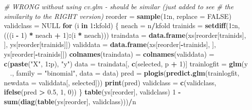 \documentclass[]{article}
\newenvironment{Shaded}{\begin{snugshade}}{\end{snugshade}}
\newcommand{\KeywordTok}[1]{\textcolor[rgb]{0.13,0.29,0.53}{\textbf{#1}}}
\newcommand{\DataTypeTok}[1]{\textcolor[rgb]{0.13,0.29,0.53}{#1}}
\newcommand{\DecValTok}[1]{\textcolor[rgb]{0.00,0.00,0.81}{#1}}
\newcommand{\FloatTok}[1]{\textcolor[rgb]{0.00,0.00,0.81}{#1}}
\newcommand{\StringTok}[1]{\textcolor[rgb]{0.31,0.60,0.02}{#1}}
\newcommand{\CommentTok}[1]{\textcolor[rgb]{0.56,0.35,0.01}{\textit{#1}}}
\newcommand{\OtherTok}[1]{\textcolor[rgb]{0.56,0.35,0.01}{#1}}
\newcommand{\ControlFlowTok}[1]{\textcolor[rgb]{0.13,0.29,0.53}{\textbf{#1}}}
\newcommand{\OperatorTok}[1]{\textcolor[rgb]{0.81,0.36,0.00}{\textbf{#1}}}
\newcommand{\NormalTok}[1]{#1}
\begin{document}
\begin{Shaded}
\begin{Highlighting}[]
{{\CommentTok{# WRONG without using cv.glm - should be similar (just added to see}
\CommentTok{# the similarity to the RIGHT version)}
\NormalTok{reorder =}\StringTok{ }\KeywordTok{sample}\NormalTok{(}\DecValTok{1}\OperatorTok{:}\NormalTok{n, }\DataTypeTok{replace =} \OtherTok{FALSE}\NormalTok{)}
\NormalTok{validclass =}\StringTok{ }\OtherTok{NULL}
\ControlFlowTok{for}\NormalTok{ (i }\ControlFlowTok{in} \DecValTok{1}\OperatorTok{:}\NormalTok{kfold) \{}
\NormalTok{    neach =}\StringTok{ }\NormalTok{n}\OperatorTok{/}\NormalTok{kfold}
\NormalTok{    trainids =}\StringTok{ }\KeywordTok{setdiff}\NormalTok{(}\DecValTok{1}\OperatorTok{:}\NormalTok{n, (((i }\OperatorTok{-}\StringTok{ }\DecValTok{1}\NormalTok{) }\OperatorTok{*}\StringTok{ }\NormalTok{neach }\OperatorTok{+}\StringTok{ }\DecValTok{1}\NormalTok{)}\OperatorTok{:}\NormalTok{(i }\OperatorTok{*}\StringTok{ }\NormalTok{neach)))}
\NormalTok{    traindata =}\StringTok{ }\KeywordTok{data.frame}\NormalTok{(xs[reorder[trainids], ], ys[reorder[trainids]])}
\NormalTok{    validdata =}\StringTok{ }\KeywordTok{data.frame}\NormalTok{(xs[reorder[}\OperatorTok{-}\NormalTok{trainids], ], ys[reorder[}\OperatorTok{-}\NormalTok{trainids]])}
    \KeywordTok{colnames}\NormalTok{(traindata) =}\StringTok{ }\KeywordTok{colnames}\NormalTok{(validdata) =}\StringTok{ }\KeywordTok{c}\NormalTok{(}\KeywordTok{paste}\NormalTok{(}\StringTok{"X"}\NormalTok{, }\DecValTok{1}\OperatorTok{:}\NormalTok{p), }\StringTok{"y"}\NormalTok{)}
\NormalTok{    data =}\StringTok{ }\NormalTok{traindata[, }\KeywordTok{c}\NormalTok{(selected, p }\OperatorTok{+}\StringTok{ }\DecValTok{1}\NormalTok{)]}
\NormalTok{    trainlogfit =}\StringTok{ }\KeywordTok{glm}\NormalTok{(y }\OperatorTok{~}\StringTok{ }\NormalTok{., }\DataTypeTok{family =} \StringTok{"binomial"}\NormalTok{, }\DataTypeTok{data =}\NormalTok{ data)}
\NormalTok{    pred =}\StringTok{ }\KeywordTok{plogis}\NormalTok{(}\KeywordTok{predict.glm}\NormalTok{(trainlogfit, }\DataTypeTok{newdata =}\NormalTok{ validdata[, selected]))}
    \KeywordTok{print}\NormalTok{(pred)}
\NormalTok{    validclass =}\StringTok{ }\KeywordTok{c}\NormalTok{(validclass, }\KeywordTok{ifelse}\NormalTok{(pred }\OperatorTok{>}\StringTok{ }\FloatTok{0.5}\NormalTok{, }\DecValTok{1}\NormalTok{, }\DecValTok{0}\NormalTok{))}
\NormalTok{\}}
\KeywordTok{table}\NormalTok{(ys[reorder], validclass)}
\DecValTok{1} \OperatorTok{-}\StringTok{ }\KeywordTok{sum}\NormalTok{(}\KeywordTok{diag}\NormalTok{(}\KeywordTok{table}\NormalTok{(ys[reorder], validclass)))}\OperatorTok{/}\NormalTok{n}

}}
\end{Highlighting}
\end{Shaded}
\end{document}
